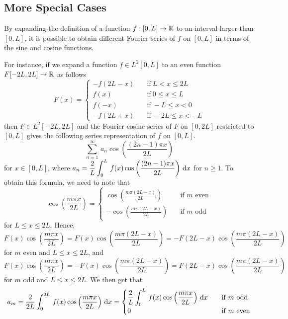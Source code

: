 \subsection{More Special Cases}\label{period4L}

By expanding the definition of a function $f:[0,L] \to \mathbb{R}$ to an
interval larger than $[0,L]$, it is possible to obtain different
Fourier series of $f$ on $[0,L]$ in terms of the sine and cosine
functions.

For instance, if we expand a function $\displaystyle f \in L^2[0,L]$ to an even
function $F[-2L,2L]\rightarrow \mathbb{R}$ as follows
\[
F(x) = \begin{cases}
-f(2L-x) & \quad \text{if} \ L<x\leq 2L \\
f(x) &  \quad \text{if} \ 0 \leq x\leq L \\
f(-x) & \quad \text{if} \ -L\leq x < 0 \\
-f(2L+x) & \quad \text{if} \ -2L\leq x < -L
\end{cases}
\]
then $\displaystyle F\in L^2[-2L,2L]$ and the Fourier cosine series of $F$ on
$[0,2L]$ restricted to $[0,L]$ gives the following series
representation of $f$ on $[0,L]$.
\begin{equation} \label{moreFSegg1}
\sum_{n=1}^{\infty} \, a_n \cos\left(\frac{(2n-1)\pi x}{2L}\right)
\end{equation}
for $x\in [0,L]$, where
$\displaystyle a_n = \frac{2}{L} \int_{0}^{L} \, f(x)
\cos\left(\frac{(2n-1) \pi x}{2L}\right) \,\mathrm{d}{x}$ for $n \geq 1$.
To obtain this formula, we need to note that
\[
\cos\left(\frac{m \pi x}{2L}\right)
= \begin{cases}
\displaystyle
\cos\left(\frac{m \pi (2L-x)}{2L}\right) & \quad \text{if $m$ even} \\
\displaystyle
-\cos\left(\frac{m \pi (2L-x)}{2L}\right) & \quad \text{if $m$ odd}
\end{cases}
\]
for $L \leq x \leq 2L$.  Hence,
\[
F(x) \cos\left(\frac{m \pi x}{2L}\right)
= F(x) \cos\left(\frac{m \pi (2L-x)}{2L}\right)
= -F\left( 2L-x\right) \cos\left(\frac{m \pi (2L-x)}{2L}\right)
\]
for $m$ even and $L \leq x \leq 2L$, and
\[
F(x) \cos\left(\frac{m \pi x}{2L}\right)
= -F(x) \cos\left(\frac{m \pi (2L-x)}{2L}\right)
= F\left( 2L-x\right) \cos\left(\frac{m \pi (2L-x)}{2L}\right)
\]
for $m$ odd and $L \leq x \leq 2L$.  We then get that
\[
a_m = \frac{2}{2L} \int_{0}^{2L} \, f(x)
\cos\left(\frac{m \pi x}{2L}\right) \,\mathrm{d}{x}
= \begin{cases}
\displaystyle \frac{2}{L} \int_{0}^{L} \, f(x)
\cos\left(\frac{m \pi x}{2L}\right) \,\mathrm{d}{x}
& \quad \text{if $m$ odd} \\
0 & \quad \text{if $m$ even}
\end{cases}
\]

